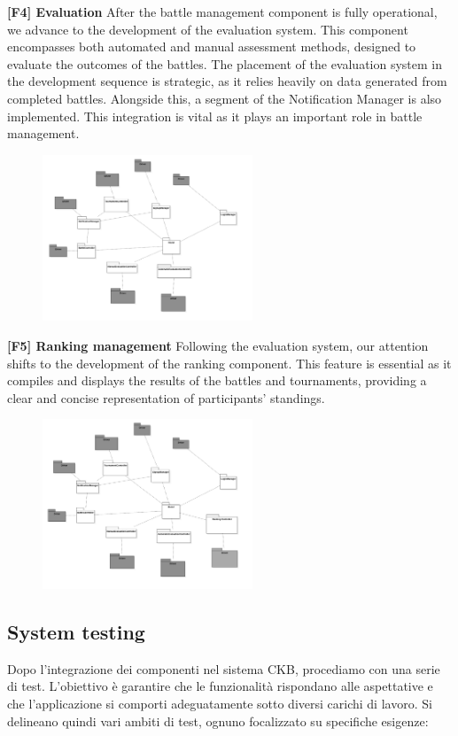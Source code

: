 \textbf{[F4] Evaluation}
After the battle management component is fully operational, we advance to the development of the evaluation system. This component encompasses both automated and manual assessment methods, designed to evaluate the outcomes of the battles. The placement of the evaluation system in the development sequence is strategic, as it relies heavily on data generated from completed battles. Alongside this, a segment of the Notification Manager is also implemented. This integration is vital as it plays an important role in battle management.
\begin{figure}[H]
    \centering
    \includegraphics[width=0.56\textwidth]{Test/Evaluation.png}
    \label{fig:enter-label}
\end{figure}
\textbf{[F5] Ranking management}
Following the evaluation system, our attention shifts to the development of the ranking component. This feature is essential as it compiles and displays the results of the battles and tournaments, providing a clear and concise representation of participants' standings.
\begin{figure}[H]
    \centering
    \includegraphics[width=0.56\textwidth]{Test/Ranking.png}
    \label{fig:enter-label}
\end{figure}
\subsection{System testing}
Dopo l'integrazione dei componenti nel sistema CKB, procediamo  con una serie di test. L'obiettivo è garantire che le funzionalità rispondano alle aspettative e che l'applicazione si comporti adeguatamente sotto diversi carichi di lavoro. Si delineano quindi vari ambiti di test, ognuno focalizzato su specifiche esigenze:

